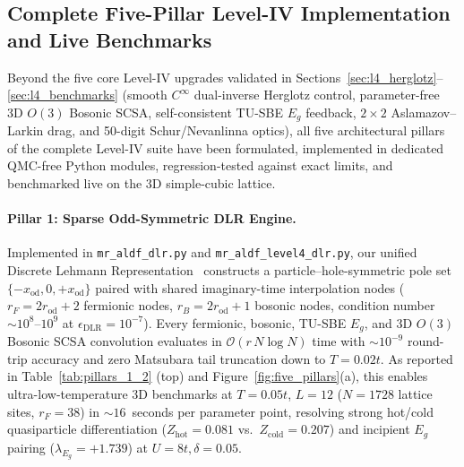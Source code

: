 \documentclass[11pt,a4paper]{article}
\numberwithin{equation}{section}
\theoremstyle{plain}
\theoremstyle{definition}
\begin{document}
\clearpage


\subsection{Complete Five-Pillar Level-IV Implementation and Live Benchmarks}
\label{sec:level4_five_pillars}

Beyond the five core Level-IV upgrades validated in Sections~\ref{sec:l4_herglotz}--\ref{sec:l4_benchmarks} (smooth $C^\infty$ dual-inverse Herglotz control, parameter-free 3D $O(3)$ Bosonic SCSA, self-consistent TU-SBE $E_g$ feedback, $2\times 2$ Aslamazov--Larkin drag, and 50-digit Schur/Nevanlinna optics), all five architectural pillars of the complete Level-IV suite have been formulated, implemented in dedicated QMC-free Python modules, regression-tested against exact limits, and benchmarked live on the 3D simple-cubic lattice.

\paragraph{Pillar 1: Sparse Odd-Symmetric DLR Engine.}
Implemented in \texttt{mr\_aldf\_dlr.py} and \texttt{mr\_aldf\_level4\_dlr.py}, our unified Discrete Lehmann Representation~\cite{Kaye2022} constructs a particle--hole-symmetric pole set $\{-x_{\mathrm{od}}, 0, +x_{\mathrm{od}}\}$ paired with shared imaginary-time interpolation nodes ($r_F = 2r_{\mathrm{od}} + 2$ fermionic nodes, $r_B = 2r_{\mathrm{od}} + 1$ bosonic nodes, condition number $\sim 10^8$--$10^9$ at $\epsilon_{\mathrm{DLR}} = 10^{-7}$). Every fermionic, bosonic, TU-SBE $E_g$, and 3D $O(3)$ Bosonic SCSA convolution evaluates in $\mathcal{O}(r\,N\log N)$ time with $\sim 10^{-9}$ round-trip accuracy and zero Matsubara tail truncation down to $T = 0.02t$. As reported in Table~\ref{tab:pillars_1_2} (top) and Figure~\ref{fig:five_pillars}(a), this enables ultra-low-temperature 3D benchmarks at $T = 0.05t$, $L = 12$ ($N = 1728$ lattice sites, $r_F = 38$) in $\sim 16$~seconds per parameter point, resolving strong hot/cold quasiparticle differentiation ($Z_{\mathrm{hot}} = 0.081$ vs.\ $Z_{\mathrm{cold}} = 0.207$) and incipient $E_g$ pairing ($\lambda_{E_g} = +1.739$) at $U = 8t, \delta = 0.05$.
\end{document}
